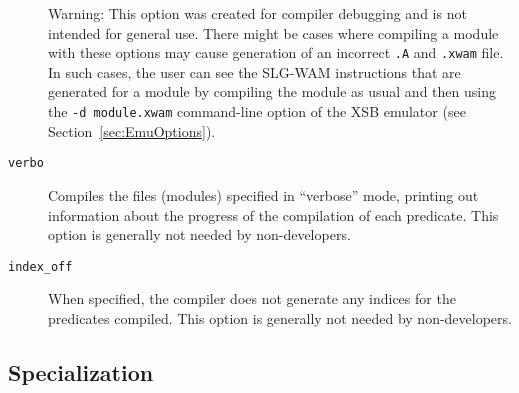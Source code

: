 \begin{description}
	{\sc Warning:} This option was created for compiler debugging and is
		not intended for general use.  There might be cases where
		compiling a module with these options may cause generation
		of an incorrect {\tt .A} and {\tt .xwam} file.  In such cases,
		the user can see the SLG-WAM instructions that are
		generated for a module by compiling the module as usual and
		then using the {\tt -d module.xwam} command-line
		option of the 
		XSB emulator (see Section~\ref{sec:EmuOptions}).

\item[{\tt verbo}] Compiles the files (modules) specified in
  ``verbose'' mode, printing out information about the progress of the
  compilation of each predicate.  This option is generally not needed
  by non-developers.
%
\item[{\tt index\_off}] When specified, the compiler does not generate
  any indices for the predicates compiled.  This option is generally
  not needed by non-developers.
\end{description}


\subsection{Specialization}\label{specialization}

